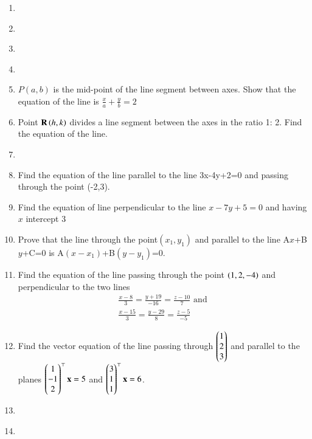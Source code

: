 \begin{enumerate}[label=\thesection.\arabic*,ref=\thesection.\theenumi]
\label{chapters/11/10/2/11}

\item 
\label{chapters/11/10/2/12}

\item 
\label{chapters/11/10/2/13}

\item 
\label{chapters/11/10/2/14}

\item 
\label{chapters/11/10/2/15}

\item 
$P(a,b)$ is the mid-point of the line segment between axes. Show that the equation of the line is $\frac{x}{a}+\frac{y}{b}=2$
\label{chapters/11/10/2/18}
\\
\solution

\item Point $\mathbf{R}\left(h, k\right)$ divides a line segment between the axes in the ratio 1: 2. Find the equation of the line.
\label{chapters/11/10/2/19}

\item 
\label{chapters/11/10/2/20}

\item Find the equation of the line  parallel to the line 3x-4y+2=0 and passing through the point (-2,3).
\label{chapters/11/10/3/7}

\item Find the equation of line perpendicular to the line $x-7y+5=0$ and having $x$ intercept $3$\\
\label{chapters/11/10/3/8}
\solution

\item Prove that the line through the point$(x_1,y_1)$ and parallel to the line A$x$+B$y$+C=0 is A$(x-x_1)$+B$(y-y_1)$=0.
\label{chapters/11/10/3/11}
\\
\solution

	\item Find the equation of the line passing through the point $\left(1,2,-4\right)$ and perpendicular to the two lines
\begin{align}
	\frac{x-8}{3}=\frac{y+19}{-16}=\frac{z-10}{7} \text{ and }\\ \frac{x-15}{3}=\frac{y-29}{8}=\frac{z-5}{-5} 
\end{align}
    \solution
		
	\item  Find the vector equation of the line passing through $\begin{pmatrix}1\\2\\3\end{pmatrix}$ and parallel to the planes $\begin{pmatrix}1\\-1\\2\end{pmatrix}^{\top}\mathbf{x} = 5$ and $\begin{pmatrix}3\\1\\1\end{pmatrix}^{\top}\mathbf{x} = 6$.  
    \solution
		
	\item
		
\label{chapters/11/10/3/12}
\item

\label{11.10.4.9}
\end{enumerate}
